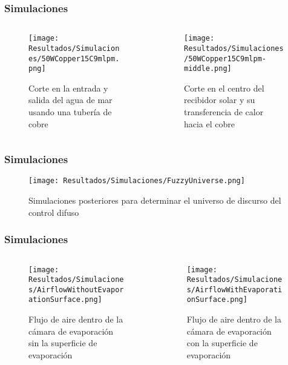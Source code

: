 	\begin{frame}
		\frametitle{Simulaciones}
		\vspace*{2mm}
		\begin{columns}
	    		\begin{column}{0.5\linewidth}
	    			\begin{figure}
	    				\texttt{[image: Resultados/Simulaciones/50WCopper15C9mlpm.png]}
	    				\caption{Corte en la entrada y salida del agua de mar usando una tubería de cobre}
	    			\end{figure}
		    \end{column}
		    \begin{column}{0.5\linewidth}
		    		\begin{figure}
	    				\texttt{[image: Resultados/Simulaciones/50WCopper15C9mlpm-middle.png]}
	    				\caption{Corte en el centro del recibidor solar y su transferencia de calor hacia el cobre}
	    			\end{figure}
		    \end{column}
	    \end{columns}
	\end{frame}
	
	\begin{frame}
		\frametitle{Simulaciones}
		\vspace*{2mm}
		\begin{figure}
    			\texttt{[image: Resultados/Simulaciones/FuzzyUniverse.png]}
    			\caption{Simulaciones posteriores para determinar el universo de discurso del control difuso}
  		\end{figure}
	\end{frame}
	
	\begin{frame}
		\frametitle{Simulaciones}
		\vspace*{2mm}
		\begin{columns}
	    		\begin{column}{0.5\linewidth}
	    			\begin{figure}
	    				\texttt{[image: Resultados/Simulaciones/AirflowWithoutEvaporationSurface.png]}
	    				\caption{Flujo de aire dentro de la cámara de evaporación sin la superficie de evaporación}
	    			\end{figure}
		    \end{column}
		    \begin{column}{0.5\linewidth}
		    		\begin{figure}
	    				\texttt{[image: Resultados/Simulaciones/AirflowWithEvaporationSurface.png]}
	    			\caption{Flujo de aire dentro de la cámara de evaporación con la superficie de evaporación}
	    			\end{figure}
		    \end{column}
	    \end{columns}		
	\end{frame}